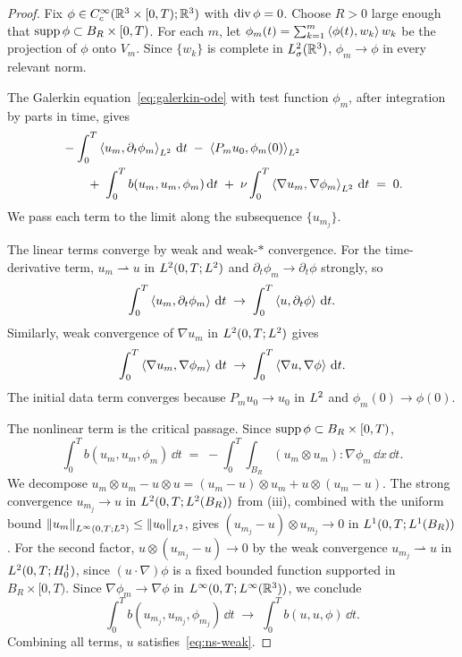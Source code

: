 \begin{proof}
  Fix $\phi \in C^\infty_c(\mathbb{R}^{3} \times [0, T); \mathbb{R}^{3})$ with
  $\operatorname{div} \phi = 0$.  Choose $R > 0$ large enough that
  $\operatorname{supp} \phi \subset B_{R} \times [0, T)$.  For each $m$, let
  $\phi_{m}(t) = \sum_{k=1}^{m} \left\langle \phi(t), w_{k} \right\rangle w_{k}$ be the projection of
  $\phi$ onto $V_{m}$.  Since $\{w_{k}\}$ is complete in $L^{2}_\sigma(\mathbb{R}^{3})$,
  $\phi_{m} \to \phi$ in every relevant norm.

  The Galerkin equation~\eqref{eq:galerkin-ode} with test function $\phi_{m}$, after
  integration by parts in time, gives
  \begin{align*}
    &-\int_{0}^{T} \left\langle u_{m}, \partial_{t} \phi_{m} \right\rangle_{L^{2}} \,\mathrm{d} t
    \;-\;
    \left\langle P_{m} u_{0}, \phi_{m}(0) \right\rangle_{L^{2}} \\
    &\qquad
    +\;\int_{0}^{T} b(u_{m}, u_{m}, \phi_{m}) \,\mathrm{d} t
    \;+\;
    \nu \int_{0}^{T} \left\langle \nabla u_{m}, \nabla \phi_{m} \right\rangle_{L^{2}} \,\mathrm{d} t
    \;=\;
    0.
  \end{align*}
  We pass each term to the limit along the subsequence $\{u_{m_{j}}\}$.

  The linear terms converge by weak and weak-$*$ convergence.  For the
  time-derivative term, $u_{m} \rightharpoonup u$ in $L^{2}(0, T; L^{2})$ and
  $\partial_{t}\phi_{m} \to \partial_{t}\phi$ strongly, so
  \[
    \int_{0}^{T} \left\langle u_{m}, \partial_{t}\phi_{m} \right\rangle \,\mathrm{d} t
    \;\to\;
    \int_{0}^{T} \left\langle u, \partial_{t}\phi \right\rangle \,\mathrm{d} t.
  \]
  Similarly, weak convergence of $\nabla u_{m}$ in $L^{2}(0, T; L^{2})$ gives
  \[
    \int_{0}^{T} \left\langle \nabla u_{m}, \nabla \phi_{m} \right\rangle \,\mathrm{d} t
    \;\to\;
    \int_{0}^{T} \left\langle \nabla u, \nabla \phi \right\rangle \,\mathrm{d} t.
  \]
  The initial data term converges because $P_{m} u_{0} \to u_{0}$ in $L^{2}$
  and $\phi_{m}(0) \to \phi(0)$.

  The nonlinear term is the critical passage.  Since
  $\operatorname{supp} \phi \subset B_{R} \times [0, T)$,
  \[
    \int_{0}^{T} b(u_{m}, u_{m}, \phi_{m}) \,\dd t
    \;=\;
    -\int_{0}^{T}\!\!\int_{B_{R}}
    (u_{m} \otimes u_{m}) : \nabla \phi_{m} \,\dd x \,\dd t.
  \]
  We decompose
  $u_{m} \otimes u_{m} - u \otimes u = (u_{m} - u) \otimes u_{m} +
  u \otimes (u_{m} - u)$.
  The strong convergence $u_{m_{j}} \to u$ in
  $L^{2}(0, T; L^{2}(B_{R}))$ from
  (iii), combined with the uniform bound
  $\left\lVert u_{m} \right\rVert_{L^{\infty}(0, T; L^{2})} \le \left\lVert u_{0} \right\rVert_{L^{2}}$, gives
  $(u_{m_{j}} - u) \otimes u_{m_{j}} \to 0$ in
  $L^{1}(0, T; L^{1}(B_{R}))$.  For the second factor,
  $u \otimes (u_{m_{j}} - u) \to 0$ by the weak convergence
  $u_{m_{j}} \rightharpoonup u$ in $L^{2}(0, T; H^{1}_0)$, since
  $(u \cdot \nabla)\phi$ is a fixed bounded function supported in
  $B_{R} \times [0, T)$.  Since
  $\nabla \phi_{m} \to \nabla \phi$ in
  $L^{\infty}(0, T; L^{\infty}(\mathbb{R}^{3}))$, we conclude
  \[
    \int_{0}^{T} b(u_{m_{j}}, u_{m_{j}}, \phi_{m_{j}}) \,\dd t
    \;\to\;
    \int_{0}^{T} b(u, u, \phi) \,\dd t.
  \]
  Combining all terms, $u$ satisfies~\eqref{eq:ns-weak}.
\end{proof}

